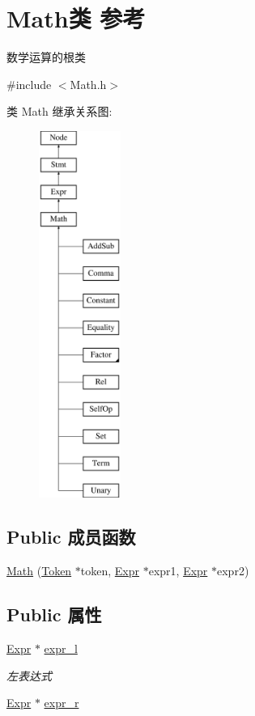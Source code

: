 \hypertarget{class_math}{}\section{Math类 参考}
\label{class_math}


数学运算的根类  




{\ttfamily \#include $<$Math.\+h$>$}

类 Math 继承关系图\+:\begin{figure}[H]
\begin{center}
\leavevmode
\includegraphics[height=12.000000cm]{class_math}
\end{center}
\end{figure}
\subsection*{Public 成员函数}
\begin{DoxyCompactItemize}
\item 
\hyperlink{class_math_af045a09f80d73b385d902041bc5cf41e}{Math} (\hyperlink{class_token}{Token} $\ast$token, \hyperlink{class_expr}{Expr} $\ast$expr1, \hyperlink{class_expr}{Expr} $\ast$expr2)
\end{DoxyCompactItemize}
\subsection*{Public 属性}
\begin{DoxyCompactItemize}
\item 
\mbox{\label{class_math_a551d177c9245212a8b5374ea1e4024ea}} 
\hyperlink{class_expr}{Expr} $\ast$ \hyperlink{class_math_a551d177c9245212a8b5374ea1e4024ea}{expr\+\_\+l}
\begin{DoxyCompactList}\small\item\em 左表达式 \end{DoxyCompactList}\item 
\hyperlink{class_expr}{Expr} $\ast$ \hyperlink{class_math_a2e2eb1f4f47fd10466db783b20183307}{expr\+\_\+r}
\end{DoxyCompactItemize}
